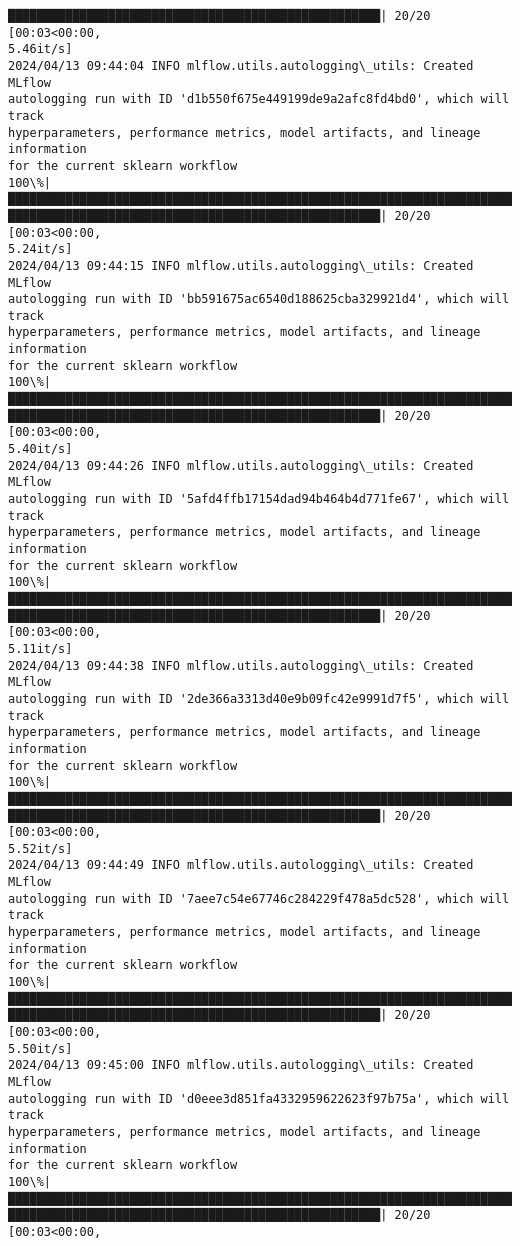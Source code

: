 \documentclass[11pt]{article}
\begin{document}
\begin{Verbatim}[commandchars=\\\{\}]
████████████████████████████████████████████████████| 20/20 [00:03<00:00,
5.46it/s]
2024/04/13 09:44:04 INFO mlflow.utils.autologging\_utils: Created MLflow
autologging run with ID 'd1b550f675e449199de9a2afc8fd4bd0', which will track
hyperparameters, performance metrics, model artifacts, and lineage information
for the current sklearn workflow
100\%|███████████████████████████████████████████████████████████████████████████
████████████████████████████████████████████████████| 20/20 [00:03<00:00,
5.24it/s]
2024/04/13 09:44:15 INFO mlflow.utils.autologging\_utils: Created MLflow
autologging run with ID 'bb591675ac6540d188625cba329921d4', which will track
hyperparameters, performance metrics, model artifacts, and lineage information
for the current sklearn workflow
100\%|███████████████████████████████████████████████████████████████████████████
████████████████████████████████████████████████████| 20/20 [00:03<00:00,
5.40it/s]
2024/04/13 09:44:26 INFO mlflow.utils.autologging\_utils: Created MLflow
autologging run with ID '5afd4ffb17154dad94b464b4d771fe67', which will track
hyperparameters, performance metrics, model artifacts, and lineage information
for the current sklearn workflow
100\%|███████████████████████████████████████████████████████████████████████████
████████████████████████████████████████████████████| 20/20 [00:03<00:00,
5.11it/s]
2024/04/13 09:44:38 INFO mlflow.utils.autologging\_utils: Created MLflow
autologging run with ID '2de366a3313d40e9b09fc42e9991d7f5', which will track
hyperparameters, performance metrics, model artifacts, and lineage information
for the current sklearn workflow
100\%|███████████████████████████████████████████████████████████████████████████
████████████████████████████████████████████████████| 20/20 [00:03<00:00,
5.52it/s]
2024/04/13 09:44:49 INFO mlflow.utils.autologging\_utils: Created MLflow
autologging run with ID '7aee7c54e67746c284229f478a5dc528', which will track
hyperparameters, performance metrics, model artifacts, and lineage information
for the current sklearn workflow
100\%|███████████████████████████████████████████████████████████████████████████
████████████████████████████████████████████████████| 20/20 [00:03<00:00,
5.50it/s]
2024/04/13 09:45:00 INFO mlflow.utils.autologging\_utils: Created MLflow
autologging run with ID 'd0eee3d851fa4332959622623f97b75a', which will track
hyperparameters, performance metrics, model artifacts, and lineage information
for the current sklearn workflow
100\%|███████████████████████████████████████████████████████████████████████████
████████████████████████████████████████████████████| 20/20 [00:03<00:00,

\end{Verbatim}
\end{document}

